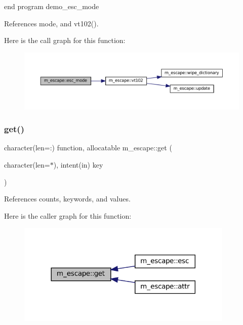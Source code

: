 end program demo\+\_\+esc\+\_\+mode 

References mode, and vt102().

Here is the call graph for this function\+:\nopagebreak
\begin{figure}[H]
\begin{center}
\leavevmode
\includegraphics[width=350pt]{namespacem__escape_a4210456d81d9a1bf328093a9635e640b_cgraph}
\end{center}
\end{figure}
\mbox{\label{namespacem__escape_af555c90c278ff964d8bce93ee0368a42}} 
\subsubsection{\texorpdfstring{get()}{get()}}
{\footnotesize\ttfamily character(len=\+:) function, allocatable m\+\_\+escape\+::get (\begin{DoxyParamCaption}\item[{character(len=$\ast$), intent(in)}]{key }\end{DoxyParamCaption})\hspace{0.3cm}{\ttfamily [private]}}



References counts, keywords, and values.

Here is the caller graph for this function\+:\nopagebreak
\begin{figure}[H]
\begin{center}
\leavevmode
\includegraphics[width=293pt]{namespacem__escape_af555c90c278ff964d8bce93ee0368a42_icgraph}
\end{center}
\end{figure}
\mbox{\label{namespacem__escape_a6add907828fd34e94b87f643a5cabc64}} 
